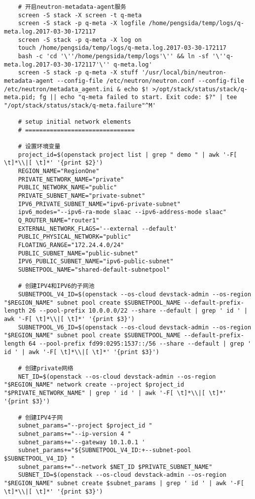 \documentclass[a4paper,left=1.5cm,right=1.5cm,11pt]{article}
\begin{document}
\begin{lstlisting}
	# 开启neutron-metadata-agent服务
	screen -S stack -X screen -t q-meta
	screen -S stack -p q-meta -X logfile /home/pengsida/temp/logs/q-meta.log.2017-03-30-172117
    screen -S stack -p q-meta -X log on
	touch /home/pengsida/temp/logs/q-meta.log.2017-03-30-172117
    bash -c 'cd '\''/home/pengsida/temp/logs'\'' && ln -sf '\''q-meta.log.2017-03-30-172117'\'' q-meta.log'
	screen -S stack -p q-meta -X stuff '/usr/local/bin/neutron-metadata-agent --config-file /etc/neutron/neutron.conf --config-file /etc/neutron/metadata_agent.ini & echo $! >/opt/stack/status/stack/q-meta.pid; fg || echo "q-meta failed to start. Exit code: $?" | tee "/opt/stack/status/stack/q-meta.failure"^M'

	# setup initial network elements
	# ===============================

	# 设置环境变量
	project_id=$(openstack project list | grep " demo " | awk '-F[ \t]*\\|[ \t]*' '{print $2}')
	REGION_NAME="RegionOne"
	PRIVATE_NETWORK_NAME="private"
	PUBLIC_NETWORK_NAME="public"
	PRIVATE_SUBNET_NAME="private-subnet"
	IPV6_PRIVATE_SUBNET_NAME="ipv6-private-subnet"
	ipv6_modes="--ipv6-ra-mode slaac --ipv6-address-mode slaac"
	Q_ROUTER_NAME="router1"
	EXTERNAL_NETWORK_FLAGS='--external --default'
	PUBLIC_PHYSICAL_NETWORK="public"
	FLOATING_RANGE="172.24.4.0/24"
	PUBLIC_SUBNET_NAME="public-subnet"
	IPV6_PUBLIC_SUBNET_NAME="ipv6-public-subnet"
	SUBNETPOOL_NAME="shared-default-subnetpool"

	# 创建IPV4和IPV6的子网池
	SUBNETPOOL_V4_ID=$(openstack --os-cloud devstack-admin --os-region "$REGION_NAME" subnet pool create $SUBNETPOOL_NAME --default-prefix-length 26 --pool-prefix 10.0.0.0/22 --share --default | grep ' id ' | awk '-F[ \t]*\\|[ \t]*' '{print $3}')
	SUBNETPOOL_V6_ID=$(openstack --os-cloud devstack-admin --os-region "$REGION_NAME" subnet pool create $SUBNETPOOL_NAME --default-prefix-length 64 --pool-prefix fd99:0295:1537::/56 --share --default | grep ' id ' | awk '-F[ \t]*\\|[ \t]*' '{print $3}')

	# 创建private网络
	NET_ID=$(openstack --os-cloud devstack-admin --os-region "$REGION_NAME" network create --project $project_id "$PRIVATE_NETWORK_NAME" | grep ' id ' | awk '-F[ \t]*\\|[ \t]*' '{print $3}')
	
	# 创建IPV4子网
	subnet_params="--project $project_id "
	subnet_params+="--ip-version 4 "
	subnet_params+='--gateway 10.1.0.1 '
	subnet_params+="${SUBNETPOOL_V4_ID:+--subnet-pool $SUBNETPOOL_V4_ID} "
    subnet_params+="--network $NET_ID $PRIVATE_SUBNET_NAME"
	SUBNET_ID=$(openstack --os-cloud devstack-admin --os-region "$REGION_NAME" subnet create $subnet_params | grep ' id ' | awk '-F[ \t]*\\|[ \t]*' '{print $3}')


\end{lstlisting}
\end{document}
